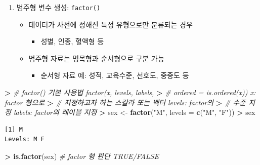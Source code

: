 \documentclass[12pt,a4paper]{book}
\newenvironment{Shaded}{\begin{snugshade}}{\end{snugshade}}
\newcommand{\KeywordTok}[1]{\textcolor[rgb]{0.13,0.29,0.53}{\textbf{#1}}}
\newcommand{\DataTypeTok}[1]{\textcolor[rgb]{0.13,0.29,0.53}{#1}}
\newcommand{\StringTok}[1]{\textcolor[rgb]{0.31,0.60,0.02}{#1}}
\newcommand{\CommentTok}[1]{\textcolor[rgb]{0.56,0.35,0.01}{\textit{#1}}}
\newcommand{\OperatorTok}[1]{\textcolor[rgb]{0.81,0.36,0.00}{\textbf{#1}}}
\newcommand{\ErrorTok}[1]{\textcolor[rgb]{0.64,0.00,0.00}{\textbf{#1}}}
\newcommand{\NormalTok}[1]{#1}
\providecommand{\tightlist}{%
  \setlength{\itemsep}{0pt}\setlength{\parskip}{0pt}}
\theoremstyle{definition}
\theoremstyle{definition}
\theoremstyle{definition}
\theoremstyle{remark}
\begin{document}
\begin{enumerate}
\def\labelenumi{\arabic{enumi}.}
\setcounter{enumi}{4}
\tightlist
\item
  범주형 변수 생성: \texttt{factor()}

  \begin{itemize}
  \tightlist
  \item
    데이터가 사전에 정해진 특정 유형으로만 분류되는 경우

    \begin{itemize}
    \tightlist
    \item
      성별, 인종, 혈액형 등
    \end{itemize}
  \item
    범주형 자료는 명목형과 순서형으로 구분 가능

    \begin{itemize}
    \tightlist
    \item
      순서형 자료 예: 성적, 교육수준, 선호도, 중증도 등
    \end{itemize}
  \end{itemize}
\end{enumerate}

\begin{Shaded}
\begin{Highlighting}[]
\OperatorTok{>}\StringTok{ }\CommentTok{# factor() 기본 사용법 factor(x, levels, labels,}
\ErrorTok{>}\StringTok{ }\CommentTok{# ordered = is.ordered(x)) x: factor 형으로}
\ErrorTok{>}\StringTok{ }\CommentTok{# 지정하고자 하는 스칼라 또는 벡터 levels: factor의}
\ErrorTok{>}\StringTok{ }\CommentTok{# 수준 지정 labels: factor의 레이블 지정}
\ErrorTok{>}\StringTok{ }\NormalTok{sex <-}\StringTok{ }\KeywordTok{factor}\NormalTok{(}\StringTok{"M"}\NormalTok{, }\DataTypeTok{levels =} \KeywordTok{c}\NormalTok{(}\StringTok{"M"}\NormalTok{, }\StringTok{"F"}\NormalTok{))}
\OperatorTok{>}\StringTok{ }\NormalTok{sex}
\end{Highlighting}
\end{Shaded}

\begin{verbatim}
[1] M
Levels: M F
\end{verbatim}

\begin{Shaded}
\begin{Highlighting}[]
\OperatorTok{>}\StringTok{ }\KeywordTok{is.factor}\NormalTok{(sex)  }\CommentTok{# factor 형 판단 TRUE/FALSE}
\end{Highlighting}
\end{Shaded}
\end{document}
